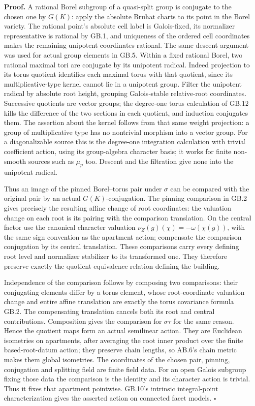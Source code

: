 \documentclass[
  11pt,
]{article}
\begin{document}
\textbf{Proof.} A rational Borel subgroup of a quasi-split group is
conjugate to the chosen one by \(G(K)\): apply the absolute Bruhat
charts to its point in the Borel variety. The rational point's absolute
cell label is Galois-fixed, its normalizer representative is rational by
GB.1, and uniqueness of the ordered cell coordinates makes the remaining
unipotent coordinates rational. The same descent argument was used for
actual group elements in GB.5. Within a fixed rational Borel, two
rational maximal tori are conjugate by its unipotent radical. Indeed
projection to its torus quotient identifies each maximal torus with that
quotient, since its multiplicative-type kernel cannot lie in a unipotent
group. Filter the unipotent radical by absolute root height, grouping
Galois-stable relative-root coordinates. Successive quotients are vector
groups; the degree-one torus calculation of GB.12 kills the difference
of the two sections in each quotient, and induction conjugates them. The
assertion about the kernel follows from that same weight projection: a
group of multiplicative type has no nontrivial morphism into a vector
group. For a diagonalizable source this is the degree-one integration
calculation with trivial coefficient action, using its group-algebra
character basis; it works for finite non-smooth sources such as
\(\mu_p\) too. Descent and the filtration give none into the unipotent
radical.

Thus an image of the pinned Borel--torus pair under \(\sigma\) can be
compared with the original pair by an actual \(G(K)\)-conjugation. The
pinning comparison in GB.2 gives precisely the resulting affine change
of root coordinates: the valuation change on each root is its pairing
with the comparison translation. On the central factor use the canonical
character valuation \(\nu_Z(g)(\chi)=-\omega(\chi(g))\), with the same
sign convention as the apartment action; compensate the comparison
conjugation by its central translation. These comparisons carry every
defining root level and normalizer stabilizer to its transformed one.
They therefore preserve exactly the quotient equivalence relation
defining the building.

Independence of the comparison follows by composing two comparisons:
their conjugating elements differ by a torus element, whose
root-coordinate valuation change and entire affine translation are
exactly the torus covariance formula GB.2. The compensating translation
cancels both its root and central contributions. Composition gives the
comparison for \(\sigma\tau\) for the same reason. Hence the quotient
maps form an actual semilinear action. They are Euclidean isometries on
apartments, after averaging the root inner product over the finite
based-root-datum action; they preserve chain lengths, so AB.6's chain
metric makes them global isometries. The coordinates of the chosen pair,
pinning, conjugation and splitting field are finite field data. For an
open Galois subgroup fixing those data the comparison is the identity
and its character action is trivial. Thus it fixes that apartment
pointwise. GB.10's intrinsic integral-point characterization gives the
asserted action on connected facet models. \(\square\)
\end{document}
